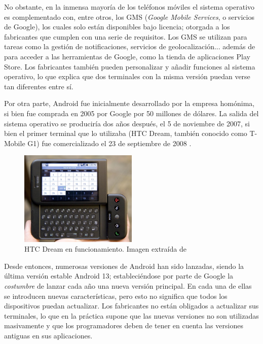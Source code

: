             No obstante, en la inmensa mayoría de los teléfonos móviles el sistema operativo es complementado con,
            entre otros, los GMS (\textit{Google Mobile Services}, o servicios de Google), los cuales solo están 
            disponibles bajo licencia; otorgada a los fabricantes que cumplen con una serie de requisitos. Los GMS 
            se utilizan para tareas como la gestión de notificaciones, servicios de geolocalización... además de para 
            acceder a las herramientas de Google, como la tienda de aplicaciones Play Store. Los fabricantes también 
            pueden personalizar y añadir funciones al sistema operativo, lo que explica que dos terminales con la misma 
            versión puedan verse tan diferentes entre sí. 
            

            Por otra parte, Android fue inicialmente desarrollado por la empresa homónima, si bien fue comprada en 2005
            por Google por 50 millones de dólares. La salida del sistema operativo se produciría dos años después, el 5 
            de noviembre de 2007, si bien el primer terminal que lo utilizaba (HTC Dream, también conocido como 
            T-Mobile G1) fue comercializado el 23 de septiembre de 2008 \cite{adeva_android_2023} \cite{marquez_asi_2022}.

            \begin{figure}[h]
                \centering
                \includegraphics[width=0.5\textwidth]{figures/HTC Dream.jpg}
                \caption[HTC Dream en funcionamiento.]{HTC Dream en funcionamiento. Imagen extraída de \cite{oryl_t-mobile_2008}}
                \label{figure:android:htc_dream}
            \end{figure}

            Desde entonces, numerosas versiones de Android han sido lanzadas, siendo la última versión estable Android 
            13; estableciéndose por parte de Google la \textit{costumbre} de lanzar cada año una nueva versión principal. 
            En cada una de ellas se introducen nuevas características, pero esto no significa que todos los dispositivos 
            puedan actualizar. Los fabricantes no están obligados a actualizar sus terminales, lo que en la práctica 
            supone que las nuevas versiones no son utilizadas masivamente y que los programadores deben de tener en 
            cuenta las versiones antiguas en sus aplicaciones. 
            

